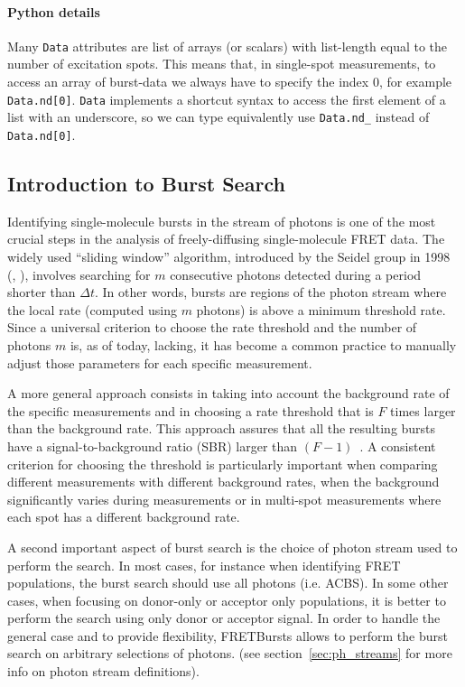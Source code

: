 \paragraph{Python details}
Many \verb|Data| attributes are list of arrays (or scalars) with list-length
equal to the number of excitation spots. This means that, in
single-spot measurements, to access an array of burst-data
we always have to specify the index 0, for example \verb|Data.nd[0]|.
\verb|Data| implements a shortcut syntax to access the first element of a list
with an underscore, so we can type equivalently use
\verb|Data.nd_| instead of \verb|Data.nd[0]|.

\subsection{Introduction to Burst Search}
\label{sec:burstsearch_intro}

Identifying single-molecule bursts in the stream of photons is
one of the most crucial steps in the analysis of freely-diffusing single-molecule FRET data.
The widely used ``sliding window'' algorithm, introduced by the Seidel group in 1998
(\cite{Eggeling_1998}, \cite{Fries_1998}), involves searching for
$m$ consecutive photons detected during a period shorter than
$\Delta t$. In other words, bursts are regions of the photon stream where the
local rate (computed using $m$ photons) is above a minimum threshold rate. 
Since a universal criterion to choose the rate threshold and 
the number of photons $m$ is, as of today, lacking, it has become a common
practice to manually adjust those parameters for each specific measurement.

A more general approach consists in taking into account the background rate of
the specific measurements and in choosing a rate threshold that is $F$ times
larger than the background rate. This approach assures that all the resulting bursts
have a signal-to-background ratio (SBR) larger than
$(F-1)$~\cite{Michalet_2012}. A consistent criterion for choosing the threshold is
particularly important when comparing different measurements with different background
rates, when the background significantly varies during measurements or in
multi-spot measurements where each spot has a different background rate.

A second important aspect of burst search is the choice of photon stream used
to perform the search.
In most cases, for instance when identifying FRET populations,
the burst search should use all photons (i.e. ACBS). In some other cases, when focusing on
donor-only or acceptor only populations, it is better to perform the search using
only donor or acceptor signal.
In order to handle the general case and to provide flexibility,
FRETBursts allows to perform the burst search on arbitrary selections of photons.
(see section~\ref{sec:ph_streams} for more info on photon stream definitions).

